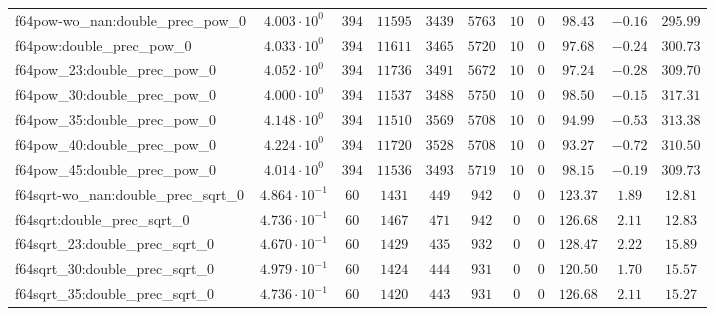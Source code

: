 \begin{tabular}{|l|c|c|c|c|c|c|c|c|c|c|}
f64pow-wo\_nan:double\_prec\_pow\_0            & $ 4.003 \cdot 10^{0}  $ & $ 394    $ & $ 11595  $ & $ 3439  $ & $ 5763  $ & $ 10  $ & $ 0 $ & $ 98.43       $ & $ -0.16   $ & $ 295.99  $ \\
f64pow:double\_prec\_pow\_0                    & $ 4.033 \cdot 10^{0}  $ & $ 394    $ & $ 11611  $ & $ 3465  $ & $ 5720  $ & $ 10  $ & $ 0 $ & $ 97.68       $ & $ -0.24   $ & $ 300.73  $ \\
f64pow\_23:double\_prec\_pow\_0                & $ 4.052 \cdot 10^{0}  $ & $ 394    $ & $ 11736  $ & $ 3491  $ & $ 5672  $ & $ 10  $ & $ 0 $ & $ 97.24       $ & $ -0.28   $ & $ 309.70  $ \\
f64pow\_30:double\_prec\_pow\_0                & $ 4.000 \cdot 10^{0}  $ & $ 394    $ & $ 11537  $ & $ 3488  $ & $ 5750  $ & $ 10  $ & $ 0 $ & $ 98.50       $ & $ -0.15   $ & $ 317.31  $ \\
f64pow\_35:double\_prec\_pow\_0                & $ 4.148 \cdot 10^{0}  $ & $ 394    $ & $ 11510  $ & $ 3569  $ & $ 5708  $ & $ 10  $ & $ 0 $ & $ 94.99       $ & $ -0.53   $ & $ 313.38  $ \\
f64pow\_40:double\_prec\_pow\_0                & $ 4.224 \cdot 10^{0}  $ & $ 394    $ & $ 11720  $ & $ 3528  $ & $ 5708  $ & $ 10  $ & $ 0 $ & $ 93.27       $ & $ -0.72   $ & $ 310.50  $ \\
f64pow\_45:double\_prec\_pow\_0                & $ 4.014 \cdot 10^{0}  $ & $ 394    $ & $ 11536  $ & $ 3493  $ & $ 5719  $ & $ 10  $ & $ 0 $ & $ 98.15       $ & $ -0.19   $ & $ 309.73  $ \\
f64sqrt-wo\_nan:double\_prec\_sqrt\_0          & $ 4.864 \cdot 10^{-1} $ & $ 60     $ & $ 1431   $ & $ 449   $ & $ 942   $ & $ 0   $ & $ 0 $ & $ 123.37      $ & $ 1.89    $ & $ 12.81   $ \\
f64sqrt:double\_prec\_sqrt\_0                  & $ 4.736 \cdot 10^{-1} $ & $ 60     $ & $ 1467   $ & $ 471   $ & $ 942   $ & $ 0   $ & $ 0 $ & $ 126.68      $ & $ 2.11    $ & $ 12.83   $ \\
f64sqrt\_23:double\_prec\_sqrt\_0              & $ 4.670 \cdot 10^{-1} $ & $ 60     $ & $ 1429   $ & $ 435   $ & $ 932   $ & $ 0   $ & $ 0 $ & $ 128.47      $ & $ 2.22    $ & $ 15.89   $ \\
f64sqrt\_30:double\_prec\_sqrt\_0              & $ 4.979 \cdot 10^{-1} $ & $ 60     $ & $ 1424   $ & $ 444   $ & $ 931   $ & $ 0   $ & $ 0 $ & $ 120.50      $ & $ 1.70    $ & $ 15.57   $ \\
f64sqrt\_35:double\_prec\_sqrt\_0              & $ 4.736 \cdot 10^{-1} $ & $ 60     $ & $ 1420   $ & $ 443   $ & $ 931   $ & $ 0   $ & $ 0 $ & $ 126.68      $ & $ 2.11    $ & $ 15.27   $ \\

\end{tabular}
